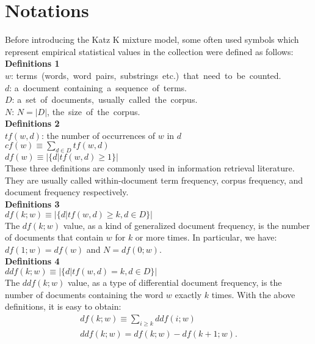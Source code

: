 \documentclass[english]{jnlp_1.4_rep}
\begin{document}
\section{Notations}

Before introducing the Katz K mixture model, some often used symbols which represent empirical statistical values in the collection were
defined as follows: \\
\textbf{Definitions 1}\\
    $w$:  \mbox{terms (words, word pairs, substrings etc.) that need to be counted.} \\
    $d$:  \mbox{a document containing a sequence of terms.} \\
    $D$:  \mbox{a set of documents, usually called the corpus.} \\
    $N$:  $N=|D|$, \mbox{the size of the corpus.} \\
\textbf{Definitions 2} \\
    $\mathit{tf}(w,d)$: the number of occurrences of $w$ in $d$ \\
    $\mathit{cf}(w) \equiv \sum\limits_{d \in D}\mathit{tf}(w,d)$ \\
    $\mathit{df}(w) \equiv \vert\{d \vert \mathit{tf}(w,d)\ge 1\}\vert$ \\
These three definitions are commonly used in information retrieval literature. They are usually called within-document term frequency, corpus
frequency, and document frequency respectively. \\
\textbf{Definitions 3} \\
  $\mathit{df}(k;w) \equiv \vert\{d \vert \mathit{tf}(w,d)\ge k, d \in D \}\vert $ \\
  The $\mathit{df}(k;w)$ value, as a kind of generalized document frequency, is the number of documents that
	contain $w$ for $k$ or more times. In particular, we have: $\mathit{df}(1;w)=\mathit{df}(w)$ and $N=\mathit{df}(0;w)$. \\
\textbf{Definitions 4} \\
    $\mathit{ddf}(k;w)\equiv \vert \{d \vert \mathit{tf}(w,d)=k,d \in D \} \vert $ \\
    The $\mathit{ddf}(k;w)$ value, as a type of differential document frequency, 
	is the number of documents containing the word $w$ exactly $k$ times.
    With the above definitions, it is easy to obtain:
\begin{gather*}
  \mathit{df}(k;w) \equiv \sum\limits_{i \ge k}\mathit{ddf}(i;w) \\
  \mathit{ddf}(k;w)=\mathit{df}(k;w)-\mathit{df}(k+1;w).
\end{gather*}
\end{document}

